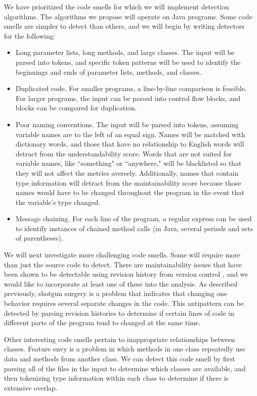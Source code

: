 \documentclass{sig-alternate}
\begin{document}
We have prioritized the code smells for which we will implement detection algorithms. The algorithms we propose will operate on Java programs. Some code smells are simpler to detect than others, and we will begin by writing detectors for the following:
\begin{itemize}
\item Long parameter lists, long methods, and large classes. The input will be parsed into tokens, and specific token patterns will be used to identify the beginnings and ends of parameter lists, methods, and classes.
\item Duplicated code.  For smaller programs, a line-by-line comparison is feasible. For larger programs, the input can be parsed into control flow blocks, and blocks can be compared for duplication. 
\item Poor naming conventions. The input will be parsed into tokens, assuming variable names are to the left of an equal sign. Names will be matched with dictionary words, and those that have no relationship to English words will detract from the understandability score. Words that are not suited for variable names, like ``something" or ``anywhere," will be blacklisted so that they will not affect the metrics aversely.  Additionally, names that contain type information will detract from the maintainability score because those names would have to be changed throughout the program in the event that the variable's type changed.
\item Message chaining. For each line of the program, a regular express can be used to identify instances of chained method calls (in Java, several periods and sets of  parentheses). 
\end{itemize}
We will next investigate more challenging code smells. Some will require more than just the source code to detect. There are maintainability issues that have been shown to be detectable using revision history from version control \cite{palomba}, and we would like to incorporate at least one of these into the analysis.  As described previously, shotgun surgery is a problem that indicates that changing one behavior requires several separate changes in the code.  This antipattern can be detected by parsing revision histories to determine if certain lines of code in different parts of the program tend to changed at the same time.

Other interesting code smells pertain to inappropriate relationships between classes. Feature envy is a problem in which methods in one class repeatedly use data and methods from another class. We can detect this code smell by first parsing all of the files in the input to determine which classes are available, and then tokenizing type information within each class to determine if there is extensive overlap. 
\end{document}
